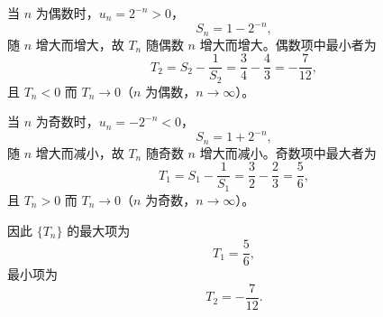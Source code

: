 \begin{answer}
当 $n$ 为偶数时，$u_n=2^{-n}>0$，
\nopagebreak[4]
\[S_n=1-2^{-n},\]
随 $n$ 增大而增大，故 $T_n$ 随偶数 $n$ 增大而增大。偶数项中最小者为
\nopagebreak[4]
\[T_2=S_2-\frac1{S_2}=\frac34-\frac43=-\frac7{12},\]
且 $T_n<0$ 而 $T_n\to0$（$n$ 为偶数，$n\to\infty$）。

当 $n$ 为奇数时，$u_n=-2^{-n}<0$，
\nopagebreak[4]
\[S_n=1+2^{-n},\]
随 $n$ 增大而减小，故 $T_n$ 随奇数 $n$ 增大而减小。奇数项中最大者为
\nopagebreak[4]
\[T_1=S_1-\frac1{S_1}=\frac32-\frac23=\frac56,\]
且 $T_n>0$ 而 $T_n\to0$（$n$ 为奇数，$n\to\infty$）。

因此 $\{T_n\}$ 的最大项为
\nopagebreak[4]
\[T_1=\frac56,\]
最小项为
\nopagebreak[4]
\[T_2=-\frac7{12}.\]



\end{answer}
